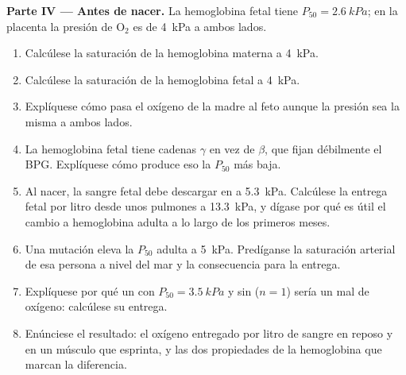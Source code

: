 \begin{problem}
\medskip
\noindent\textbf{Parte IV --- Antes de nacer.}
La hemoglobina fetal tiene $P_{50} = \qty{2.6}{kPa}$; en la placenta la
presión de $\mathrm{O_2}$ es de \qty{4}{kPa} a ambos lados.
\begin{enumerate}[resume]
  \item Calcúlese la saturación de la hemoglobina materna a \qty{4}{kPa}.
  \item Calcúlese la saturación de la hemoglobina fetal a \qty{4}{kPa}.
  \item Explíquese cómo pasa el oxígeno de la madre al feto aunque la
        presión sea la misma a ambos lados.
  \item La hemoglobina fetal tiene cadenas $\gamma$ en vez de $\beta$, que
        fijan débilmente el BPG. Explíquese cómo produce eso la $P_{50}$
        más baja.
  \item Al nacer, la sangre fetal debe descargar en  a
        \qty{5.3}{kPa}. Calcúlese la entrega fetal por litro desde unos
        pulmones a \qty{13.3}{kPa}, y dígase por qué es útil el cambio a
        hemoglobina adulta a lo largo de los primeros meses.
  \item Una mutación eleva la $P_{50}$ adulta a \qty{5}{kPa}. Predíganse la
        saturación arterial de esa persona a nivel del mar y la
        consecuencia para la entrega.
  \item Explíquese por qué un  con $P_{50} = \qty{3.5}{kPa}$ y
        sin  ($n = 1$) sería un mal  de oxígeno:
        calcúlese su entrega.
  \item Enúnciese el resultado: el oxígeno entregado por litro de sangre en
        reposo y en un músculo que esprinta, y las dos propiedades de la
        hemoglobina que marcan la diferencia.
\end{enumerate}
\end{problem}
